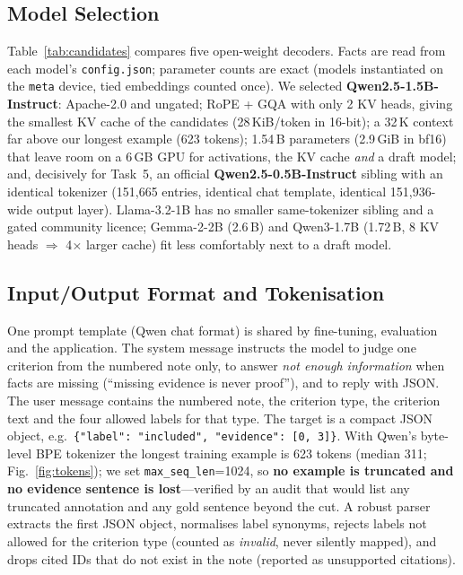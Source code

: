 \subsection{Model Selection}\label{sec:model}
Table~\ref{tab:candidates} compares five open-weight decoders. Facts are read from each model's
\texttt{config.json}; parameter counts are exact (models instantiated on the \texttt{meta} device, tied
embeddings counted once). We selected \textbf{Qwen2.5-1.5B-Instruct}: Apache-2.0 and ungated; RoPE + GQA with
only 2 KV heads, giving the smallest KV cache of the candidates (28\,KiB/token in 16-bit); a 32\,K context
far above our longest example (623 tokens); 1.54\,B parameters (2.9\,GiB in bf16) that leave room on a 6\,GB
GPU for activations, the KV cache \emph{and} a draft model; and, decisively for Task~5, an official
\textbf{Qwen2.5-0.5B-Instruct} sibling with an identical tokenizer (151{,}665 entries,
identical chat template, identical 151{,}936-wide output layer). Llama-3.2-1B has no smaller same-tokenizer
sibling and a gated community licence; Gemma-2-2B (2.6\,B) and Qwen3-1.7B (1.72\,B, 8 KV
heads $\Rightarrow$ 4$\times$ larger cache) fit less comfortably next to a draft model.


\subsection{Input/Output Format and Tokenisation}\label{sec:format}
One prompt template (Qwen chat format) is shared by fine-tuning, evaluation and the application. The system
message instructs the model to judge one criterion from the numbered note only, to answer \emph{not enough
information} when facts are missing (``missing evidence is never proof''), and to reply with JSON. The user
message contains the numbered note, the criterion type, the criterion text and the four allowed labels for
that type. The target is a compact JSON object, e.g.\
\texttt{\{"label": "included", "evidence": [0, 3]\}}. With Qwen's byte-level BPE tokenizer the longest
training example is 623 tokens (median 311; Fig.~\ref{fig:tokens}); we set \texttt{max\_seq\_len}=1024, so
\textbf{no example is truncated and no evidence sentence is lost}---verified by an audit that would list any
truncated annotation and any gold sentence beyond the cut. A robust parser extracts the first JSON object,
normalises label synonyms, rejects labels not allowed for the criterion type (counted as \emph{invalid}, never
silently mapped), and drops cited IDs that do not exist in the note (reported as unsupported citations).

